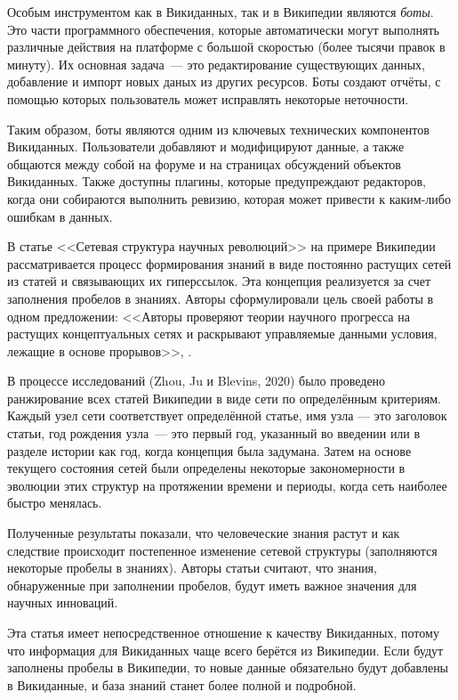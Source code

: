 Особым инструментом как в Викиданных, так и в Википедии являются \textit{боты}\footnotemark.  Это части программного обеспечения, которые автоматически могут выполнять различные действия на платформе с большой скоростью (более тысячи правок в минуту). Их основная задача~--- это редактирование существующих данных, добавление и импорт новых даных из других ресурсов. Боты создают отчёты, с помощью которых пользователь может исправлять некоторые неточности. 

Таким образом, боты являются одним из ключевых технических компонентов Викиданных. Пользователи добавляют и модифицируют данные, а также общаются между собой на форуме и на страницах обсуждений объектов Викиданных. Также доступны плагины, которые предупреждают редакторов, когда они собираются выполнить ревизию, которая может привести к каким-либо ошибкам в данных.

В статье <<Сетевая структура научных революций>>\cite{Network_structure_revolutions} на примере Википедии рассматривается процесс формирования знаний в виде постоянно растущих сетей из статей и связывающих их гиперссылок. Эта концепция реализуется за счет заполнения пробелов в знаниях. Авторы сформулировали цель своей работы в одном предложении: <<Авторы проверяют теории научного прогресса на растущих концептуальных сетях и раскрывают управляемые данными условия, лежащие в основе прорывов>>\footnotemark, \cite{Network_structure_revolutions}.

В процессе исследований (Zhou, Ju и Blevins, 2020)\cite{Network_structure_revolutions}  было проведено ранжирование всех статей Википедии в виде сети по определённым критериям. Каждый узел сети соответствует определённой статье, имя узла --- это заголовок статьи, год рождения узла~--- это первый год, указанный во введении или в разделе истории как год, когда концепция была задумана. Затем на основе текущего состояния сетей были определены некоторые закономерности в эволюции этих структур на протяжении времени и периоды, когда сеть наиболее быстро менялась.

Полученные результаты показали, что человеческие знания растут и как следствие происходит постепенное изменение сетевой структуры (заполняются некоторые пробелы в знаниях). Авторы статьи\cite{Network_structure_revolutions} считают, что знания, обнаруженные при заполнении пробелов, будут иметь важное значения для научных инноваций. 

Эта статья имеет непосредственное отношение к качеству Викиданных, потому что информация для Викиданных чаще всего берётся из Википедии. Если будут заполнены пробелы в Википедии, то новые данные обязательно будут добавлены в Викиданные, и база знаний станет более полной и подробной.
